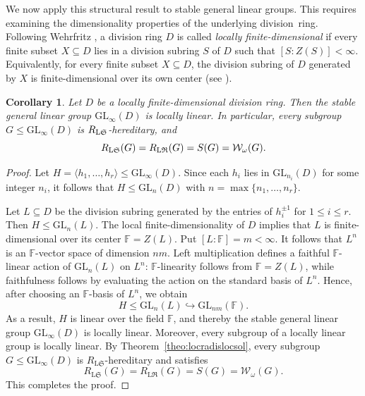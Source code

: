 \documentclass[11pt, reqno]{amsart}
\numberwithin{equation}{section}
\newtheorem{corollary}[theorem]{Corollary}
\theoremstyle{definition}
\numberwithin{equation}{section}
\begin{document}
We now apply this structural result to stable general linear groups. This requires examining the dimensionality properties of the underlying division~ring. Following Wehrfritz \cite[p.~325]{Wehrfritz94}, a division ring $D$
is called \emph{locally finite-dimensional} if every finite subset
$X\subseteq D$ lies in a division subring $S$ of $D$ such that
$[S:Z(S)]<\infty.$
Equivalently, for every finite subset $X\subseteq D$, the division
subring of $D$ generated by $X$ is finite-dimensional over its own
center (see \cite[Theorem~1, p.~228]{Jacobson1964}).

\begin{corollary} \label{cor:linearoverweaklocfinlocsolrad}
Let $D$ be a locally finite-dimensional division ring. Then the stable general linear group $\mathrm{GL}_\infty(D)$ is locally linear. In particular, every subgroup $G \leq \mathrm{GL}_\infty(D)$ is $R_{\textup{L}\mathfrak{S}}$-hereditary, and 
$$ R_{\textup{L}\mathfrak{S}}(G) = R_{\textup{L}\mathfrak{R}}(G) = S(G) = \mathcal{W}_{\omega}(G). $$
\end{corollary}
    
\begin{proof}
Let $H = \langle h_1, \dots, h_r \rangle \leq \mathrm{GL}_\infty(D)$. Since each $h_i$ lies in $\mathrm{GL}_{n_i}(D)$ for some integer $n_i$, it follows that $H \leq \mathrm{GL}_n(D)$ with $n = \max\{n_1, \dots, n_r\}$.

Let $L \subseteq D$ be the division subring generated by the entries of $h_i^{\pm 1}$ for $1 \le i \le r$. Then $H \leq \mathrm{GL}_n(L)$.
The local finite-dimensionality of $D$ implies that $L$ is
finite-dimensional over its center $\mathbb{F}=Z(L)$. Put
$[L:\mathbb{F}]=m<\infty$. It follows that $L^n$ is an
$\mathbb{F}$-vector space of dimension $nm$. Left multiplication
defines a faithful $\mathbb{F}$-linear action of
$\mathrm{GL}_n(L)$ on $L^n$: $\mathbb{F}$-linearity follows from
$\mathbb{F}=Z(L)$, while faithfulness follows by evaluating the action
on the standard basis of $L^n$. Hence, after choosing an
$\mathbb{F}$-basis of $L^n$, we obtain
$$H\leq \mathrm{GL}_n(L) \hookrightarrow \mathrm{GL}_{nm}(\mathbb{F}).$$
As a result, $H$ is linear over the field $\mathbb{F}$, and thereby the stable general linear group $\mathrm{GL}_\infty(D)$ is locally linear.
Moreover, every subgroup of a locally linear group is locally linear. By Theorem~\ref{theo:locradislocsol}, every subgroup $G\leq \mathrm{GL}_{\infty}(D)$ is
$R_{\mathrm{L}\mathfrak{S}}$-hereditary and satisfies
  $$R_{\mathrm{L}\mathfrak{S}}(G)  = R_{\mathrm{L}\mathfrak{R}}(G) = S(G) = \mathcal{W}_{\omega}(G).$$
This completes the proof.
\end{proof}
\end{document}
